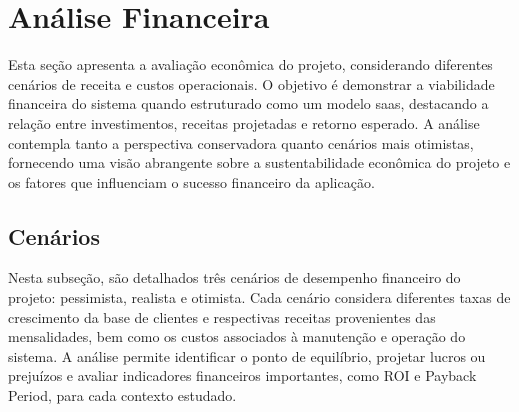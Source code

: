 \section{Análise Financeira}

Esta seção apresenta a avaliação econômica do projeto, considerando diferentes cenários de receita e custos operacionais.  
O objetivo é demonstrar a viabilidade financeira do sistema quando estruturado como um modelo \gls{saas}, destacando a relação entre investimentos, receitas projetadas e retorno esperado.  
A análise contempla tanto a perspectiva conservadora quanto cenários mais otimistas, fornecendo uma visão abrangente sobre a sustentabilidade econômica do projeto e os fatores que influenciam o sucesso financeiro da aplicação.

\subsection{Cenários}

Nesta subseção, são detalhados três cenários de desempenho financeiro do projeto: pessimista, realista e otimista.  
Cada cenário considera diferentes taxas de crescimento da base de clientes e respectivas receitas provenientes das mensalidades, bem como os custos associados à manutenção e operação do sistema.  
A análise permite identificar o ponto de equilíbrio, projetar lucros ou prejuízos e avaliar indicadores financeiros importantes, como ROI e Payback Period, para cada contexto estudado.






